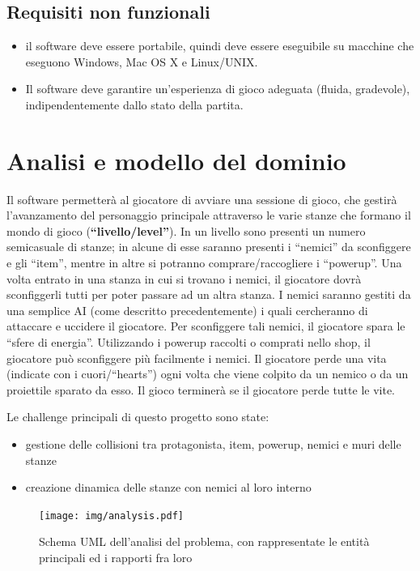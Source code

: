 \documentclass[a4paper,12pt]{report}
\begin{document}
\subsection*{Requisiti non funzionali}
\begin{itemize}
    \item il software deve essere portabile, quindi deve essere eseguibile su macchine che eseguono Windows, Mac OS X e Linux/UNIX.
    \item Il software deve garantire un'esperienza di gioco adeguata (fluida, gradevole), indipendentemente dallo stato della partita.
\end{itemize}

\newpage
\section{Analisi e modello del dominio}
Il software permetterà al giocatore di avviare una sessione di gioco, che gestirà l'avanzamento del personaggio principale attraverso le varie stanze che formano il mondo di gioco (\textbf{``livello/level''}).
In un livello sono presenti un numero semicasuale di stanze; in alcune di esse saranno presenti i ``nemici'' da sconfiggere e gli ``item'', mentre in altre si potranno comprare/raccogliere i ``powerup''.
Una volta entrato in una stanza in cui si trovano i nemici, il giocatore dovrà sconfiggerli tutti per poter passare ad un altra stanza.
I nemici saranno gestiti da una semplice AI (come descritto precedentemente) i quali cercheranno di attaccare e uccidere il giocatore.
Per sconfiggere tali nemici, il giocatore spara le ``sfere di energia''.
Utilizzando i powerup raccolti o comprati nello shop, il giocatore può sconfiggere più facilmente i nemici.
Il giocatore perde una vita (indicate con i cuori/``hearts'') ogni volta che viene colpito da un nemico o da un proiettile sparato da esso.
Il gioco terminerà se il giocatore perde tutte le vite.

Le challenge principali di questo progetto sono state:
\begin{itemize}
    \item gestione delle collisioni tra protagonista, item, powerup, nemici e muri delle stanze
    \item creazione dinamica delle stanze con nemici al loro interno
\end{itemize}

\begin{figure}[H]
    \centering{}
    \texttt{[image: img/analysis.pdf]}
    \caption{Schema UML dell'analisi del problema, con rappresentate le entità principali ed i rapporti fra loro}
    \label{img:analysis}
\end{figure}
\end{document}
